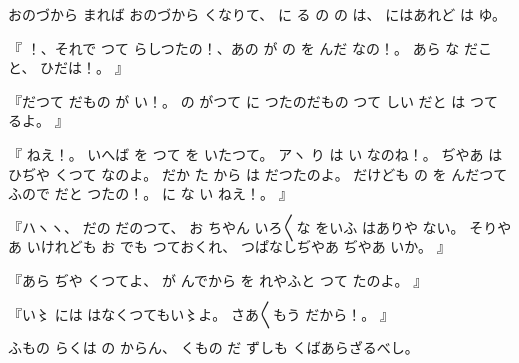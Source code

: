 おのづから
まれば
おのづから
くなりて、
に
る
の
の
は、
にはあれど
は
ゆ。

『
！、それで
つて
らしつたの！、あの
が
の
を
んだ
なの！。
あら
な
だこと、
ひだは！。
』

『だつて
だもの
が
い！。
の
がつて
に
つたのだもの
つて
しい
だと
は
つて
るよ。
』

『
ねえ！。
いへば
を
つて
を
いたつて。
アヽ
り
は
い
なのね！。
ぢやあ
は
ひぢや
くつて
なのよ。
だか
た
から
は
だつたのよ。
だけども
の
を
んだつて
ふので
だと
つたの！。
に
な
い
ねえ！。
』

『ハヽヽ、
だの
だのつて、
お
ちやん
いろ〳〵な
をいふ
はありや
ない。
そりやあ
いけれども
お
でも
つておくれ、
つぱなしぢやあ
ぢやあ
いか。
』

『あら
ぢや
くつてよ、
が
んでから
を
れやふと
つて
たのよ。
』

『い〻
には
はなくつてもい〻よ。
さあ〳〵もう
だから！。
』

ふもの
らくは
の
からん、
くもの
だ
ずしも
くばあらざるべし。
